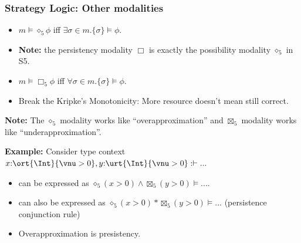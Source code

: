 \begin{frame}[fragile]
    \frametitle{Strategy Logic: Other modalities}

\begin{definition}[Modality]
    \begin{itemize}
        \item $m \models \diamond_5 \phi$ iff $\exists \sigma \in m. \{\sigma\} \models \phi$.
        \item \textbf{Note:} the persistency modality $\Box$ is exactly the possibility modality $\diamond_5$ in S5.
        \item $m \models \Box_5 \phi$ iff $\forall \sigma \in m. \{\sigma\} \models \phi$.
        \item Break the Kripke's Monotonicity: More resource doesn't mean still correct.
    \end{itemize}
\end{definition}

\textbf{Note:} The $\diamond_5$ modality works like ``overapproximation'' and $\boxtimes_5$ modality works like ``underapproximation''.

\textbf{Example:} Consider type context $x{:}\ort{\Int}{\vnu > 0}, y{:}\urt{\Int}{\vnu > 0}: \vdash ...$
\begin{itemize}
    \item can be expressed as $\diamond_5 (x > 0) \land \boxtimes_5 (y > 0) \models ...$.
    \item can also be expressed as $\diamond_5 (x > 0) * \boxtimes_5 (y > 0) \models ...$ (persistence conjunction rule)
    \item Overapproximation is presistency.
\end{itemize}
\end{frame}